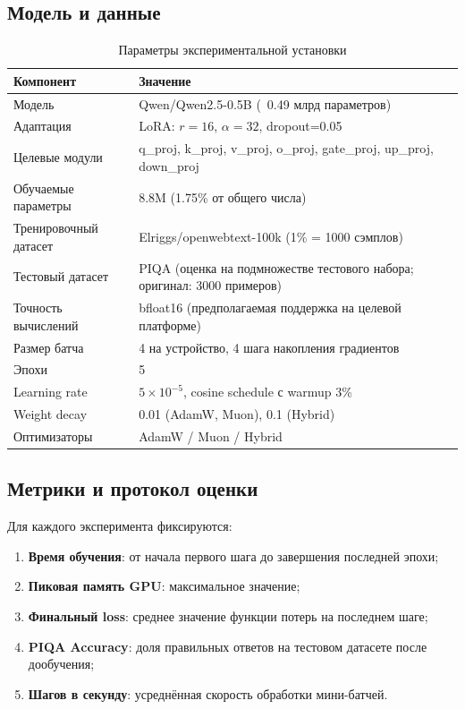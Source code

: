 \documentclass[a4paper,12pt]{article}
\begin{document}
\subsection{Модель и данные}

\begin{table}[H]
\centering
\caption{Параметры экспериментальной установки}
\label{tab:setup}
\begin{tabular}{ll}
\toprule
\textbf{Компонент} & \textbf{Значение} \\
\midrule
Модель & Qwen/Qwen2.5-0.5B (~0.49 млрд параметров) \\
Адаптация & LoRA: $r=16$, $\alpha=32$, dropout=0.05 \\
Целевые модули & q\_proj, k\_proj, v\_proj, o\_proj, gate\_proj, up\_proj, down\_proj \\
Обучаемые параметры & 8.8M (1.75\% от общего числа) \\
Тренировочный датасет & Elriggs/openwebtext-100k (1\% = 1000 сэмплов) \\
Тестовый датасет & PIQA (оценка на подмножестве тестового набора; оригинал: 3000 примеров) \\
Точность вычислений & bfloat16 (предполагаемая поддержка на целевой платформе) \\
Размер батча & 4 на устройство, 4 шага накопления градиентов \\
Эпохи & 5 \\
Learning rate & $5 \times 10^{-5}$, cosine schedule с warmup 3\% \\
Weight decay & 0.01 (AdamW, Muon), 0.1 (Hybrid) \\
Оптимизаторы & AdamW / Muon / Hybrid \\
\bottomrule
\end{tabular}
\end{table}

\subsection{Метрики и протокол оценки}

Для каждого эксперимента фиксируются:
\begin{enumerate}
    \item \textbf{Время обучения}: от начала первого шага до завершения последней эпохи;
    \item \textbf{Пиковая память GPU}: максимальное значение;
    \item \textbf{Финальный loss}: среднее значение функции потерь на последнем шаге;
    \item \textbf{PIQA Accuracy}: доля правильных ответов на тестовом датасете после дообучения;
    \item \textbf{Шагов в секунду}: усреднённая скорость обработки мини-батчей.
\end{enumerate}
\end{document}
